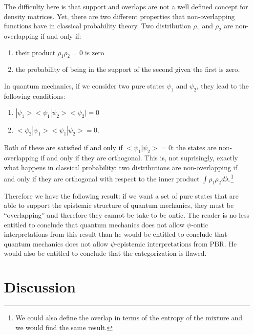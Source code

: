 \documentclass[10pt,twocolumn, nofootinbib]{revtex4-2}
\begin{document}
The difficulty here is that support and overlaps are not a well defined concept for density matrices. Yet, there are two different properties that non-overlapping functions have in classical probability theory. Two distribution $\rho_1$ and $\rho_2$ are non-overlapping if and only if:
\begin{enumerate}
	\item their product $\rho_1 \rho_2 = 0$ is zero
	\item the probability of being in the support of the second given the first is zero.
\end{enumerate}
In quantum mechanics, if we consider two pure states $\psi_1$ and $\psi_2$, they lead to the following conditions:
\begin{enumerate}
	\item $|\psi_1><\psi_1|\psi_2><\psi_2| = 0$
	\item $<\psi_2|\psi_1><\psi_1|\psi_2> = 0$.
\end{enumerate}
Both of these are satisfied if and only if $<\psi_1|\psi_2>=0$: the states are non-overlapping if and only if they are orthogonal. This is, not suprisingly, exactly what happens in classical probability: two distributions are non-overlapping if and only if they are orthogonal with respect to the inner product $\int \rho_1 \rho_2 d\lambda$.\footnote{We could also define the overlap in terms of the entropy of the mixture and we would find the same result.}

Therefore we have the following result: if we want a set of pure states that are able to support the epistemic structure of quantum mechanics, they must be ``overlapping'' and therefore they cannot be take to be ontic. The reader is no less entitled to conclude that quantum mechanics does not allow $\psi$-ontic interpretations from this result than he would be entitled to conclude that quantum mechanics does not allow $\psi$-epistemic interpretations from PBR. He would also be entitled to conclude that the categorization is flawed.



\section{Discussion}


\end{document}
